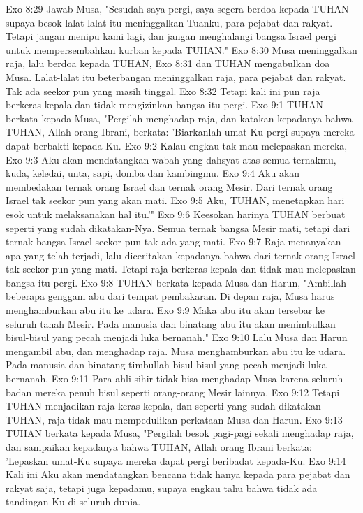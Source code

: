Exo 8:29  Jawab Musa, "Sesudah saya pergi, saya segera berdoa kepada TUHAN supaya besok lalat-lalat itu meninggalkan Tuanku, para pejabat dan rakyat. Tetapi jangan menipu kami lagi, dan jangan menghalangi bangsa Israel pergi untuk mempersembahkan kurban kepada TUHAN."
Exo 8:30  Musa meninggalkan raja, lalu berdoa kepada TUHAN,
Exo 8:31  dan TUHAN mengabulkan doa Musa. Lalat-lalat itu beterbangan meninggalkan raja, para pejabat dan rakyat. Tak ada seekor pun yang masih tinggal.
Exo 8:32  Tetapi kali ini pun raja berkeras kepala dan tidak mengizinkan bangsa itu pergi.
Exo 9:1  TUHAN berkata kepada Musa, "Pergilah menghadap raja, dan katakan kepadanya bahwa TUHAN, Allah orang Ibrani, berkata: 'Biarkanlah umat-Ku pergi supaya mereka dapat berbakti kepada-Ku.
Exo 9:2  Kalau engkau tak mau melepaskan mereka,
Exo 9:3  Aku akan mendatangkan wabah yang dahsyat atas semua ternakmu, kuda, keledai, unta, sapi, domba dan kambingmu.
Exo 9:4  Aku akan membedakan ternak orang Israel dan ternak orang Mesir. Dari ternak orang Israel tak seekor pun yang akan mati.
Exo 9:5  Aku, TUHAN, menetapkan hari esok untuk melaksanakan hal itu.'"
Exo 9:6  Keesokan harinya TUHAN berbuat seperti yang sudah dikatakan-Nya. Semua ternak bangsa Mesir mati, tetapi dari ternak bangsa Israel seekor pun tak ada yang mati.
Exo 9:7  Raja menanyakan apa yang telah terjadi, lalu diceritakan kepadanya bahwa dari ternak orang Israel tak seekor pun yang mati. Tetapi raja berkeras kepala dan tidak mau melepaskan bangsa itu pergi.
Exo 9:8  TUHAN berkata kepada Musa dan Harun, "Ambillah beberapa genggam abu dari tempat pembakaran. Di depan raja, Musa harus menghamburkan abu itu ke udara.
Exo 9:9  Maka abu itu akan tersebar ke seluruh tanah Mesir. Pada manusia dan binatang abu itu akan menimbulkan bisul-bisul yang pecah menjadi luka bernanah."
Exo 9:10  Lalu Musa dan Harun mengambil abu, dan menghadap raja. Musa menghamburkan abu itu ke udara. Pada manusia dan binatang timbullah bisul-bisul yang pecah menjadi luka bernanah.
Exo 9:11  Para ahli sihir tidak bisa menghadap Musa karena seluruh badan mereka penuh bisul seperti orang-orang Mesir lainnya.
Exo 9:12  Tetapi TUHAN menjadikan raja keras kepala, dan seperti yang sudah dikatakan TUHAN, raja tidak mau mempedulikan perkataan Musa dan Harun.
Exo 9:13  TUHAN berkata kepada Musa, "Pergilah besok pagi-pagi sekali menghadap raja, dan sampaikan kepadanya bahwa TUHAN, Allah orang Ibrani berkata: 'Lepaskan umat-Ku supaya mereka dapat pergi beribadat kepada-Ku.
Exo 9:14  Kali ini Aku akan mendatangkan bencana tidak hanya kepada para pejabat dan rakyat saja, tetapi juga kepadamu, supaya engkau tahu bahwa tidak ada tandingan-Ku di seluruh dunia.
